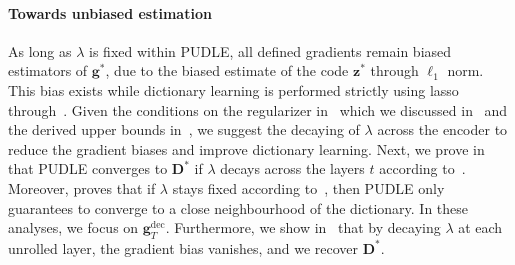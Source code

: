 \documentclass[10pt]{article} %
\newcommand{\D}{{\bm D}}
\newcommand{\z}{{\bm z}}
\newcommand{\g}{{\bm g}}
\begin{document}
%
\paragraph{Towards unbiased estimation} As long as $\lambda$ is fixed within PUDLE, all defined gradients remain biased estimators of $\g^{\ast}$, due to the biased estimate of the code $\z^{\ast}$ through $\ell_1$ norm. This bias exists while dictionary learning is performed strictly using lasso through~. Given the conditions on the regularizer in~ which we discussed in~ and the derived upper bounds in~, we suggest the decaying of $\lambda$ across the encoder to reduce the gradient biases and improve dictionary learning. Next, we prove in  that PUDLE converges to $\D^{\ast}$ if $\lambda$ decays across the layers $t$ according to~. Moreover,  proves that if $\lambda$ stays fixed according to~, then PUDLE only guarantees to converge to a close neighbourhood of the dictionary. In these analyses, we focus on $\g_T^{\text{dec}}$. Furthermore, we show in~ that by decaying $\lambda$ at each unrolled layer, the gradient bias vanishes, and we recover $\D^{\ast}$.
%
\end{document}
